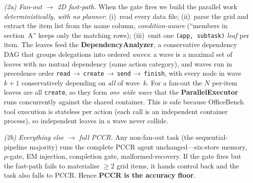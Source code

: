 \documentclass[10pt,twocolumn]{article}
\newcommand{\code}[1]{\texttt{\small #1}}
\begin{document}
\emph{(2a) Fan-out $\to$ 2D fast-path.} When the gate fires we build the parallel work
\emph{deterministically, with no planner}: (i)~read every data file; (ii)~parse the grid and extract
the item list from the name column, \emph{condition-aware} (``members in section~A'' keeps only the
matching rows); (iii)~emit one \code{(app, subtask)} \emph{leaf} per item. The leaves feed the
\textbf{DependencyAnalyzer}, a conservative dependency DAG that groups delegations into ordered
\emph{waves}: a wave is a maximal set of leaves with no mutual dependency (same action category), and
waves run in precedence order \code{read}\,$\to$\,\code{create}\,$\to$\,\code{send}\,$\to$\,\code{finish},
with every node in wave $k{+}1$ conservatively depending on \emph{all} of wave~$k$. For a fan-out the
$N$ per-item leaves are all \code{create}, so they form \emph{one wide wave} that the
\textbf{ParallelExecutor} runs concurrently against the shared container. This is safe because
OfficeBench tool execution is stateless per action (each call is an independent container process), so
independent leaves in a wave never collide.

\emph{(2b) Everything else $\to$ full PCCR.} Any non-fan-out task (the sequential-pipeline majority)
runs the complete PCCR agent unchanged---six-store memory, $\rho$-gate, EM injection, completion gate,
malformed-recovery. If the gate fires but the fast-path fails to materialise $\ge 2$ grid items, it
hands control back and the task also falls to PCCR. Hence \textbf{PCCR is the accuracy floor}.
\end{document}
